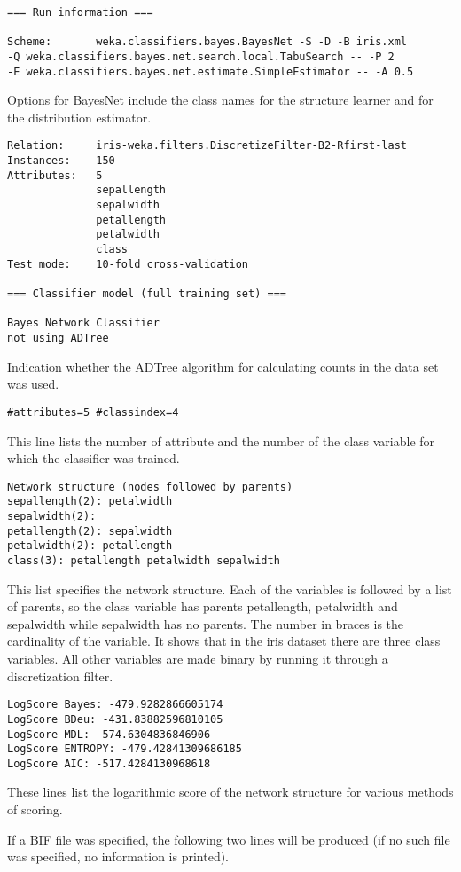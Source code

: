 \documentclass{article}
\begin{document}
\begin{verbatim}
=== Run information ===

Scheme:       weka.classifiers.bayes.BayesNet -S -D -B iris.xml 
-Q weka.classifiers.bayes.net.search.local.TabuSearch -- -P 2
-E weka.classifiers.bayes.net.estimate.SimpleEstimator -- -A 0.5
\end{verbatim}
Options for  BayesNet include the class names for the structure learner and for the 
distribution estimator.
\begin{verbatim}
Relation:     iris-weka.filters.DiscretizeFilter-B2-Rfirst-last
Instances:    150
Attributes:   5
              sepallength
              sepalwidth
              petallength
              petalwidth
              class
Test mode:    10-fold cross-validation

=== Classifier model (full training set) ===

Bayes Network Classifier
not using ADTree
\end{verbatim}
Indication whether the ADTree algorithm \cite{Moore} for calculating counts in the
data set was used.
\begin{verbatim}
#attributes=5 #classindex=4
\end{verbatim}
This line lists the number of attribute and the number of the class variable for which the 
classifier was trained.

\begin{verbatim}
Network structure (nodes followed by parents)
sepallength(2): petalwidth 
sepalwidth(2): 
petallength(2): sepalwidth 
petalwidth(2): petallength 
class(3): petallength petalwidth sepalwidth 
\end{verbatim}
This list specifies the network structure. Each of the variables is followed by
a list of parents, so the class variable has parents petallength, petalwidth and sepalwidth
while sepalwidth has no parents. The number in braces is the cardinality of the variable.
It shows that in the iris dataset there are three class variables. All other variables
are made binary by running it through a discretization filter.

\begin{verbatim}
LogScore Bayes: -479.9282866605174
LogScore BDeu: -431.83882596810105
LogScore MDL: -574.6304836846906
LogScore ENTROPY: -479.42841309686185
LogScore AIC: -517.4284130968618
\end{verbatim}
These lines list the logarithmic score of the network structure for various methods
of scoring.

If a BIF file was specified, the following two lines will be produced (if no such
file was specified, no information is printed).
\end{document}
